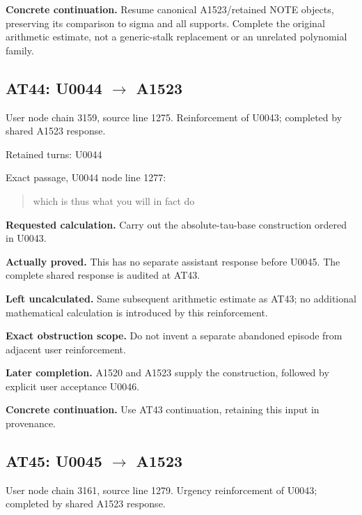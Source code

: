 \textbf{Concrete continuation.} Resume canonical A1523/retained NOTE
objects, preserving its comparison to sigma and all supports. Complete
the original arithmetic estimate, not a generic-stalk replacement or an
unrelated polynomial family.

\subsection{\texorpdfstring{AT44: U0044
\allowbreak{}\ensuremath{→}\allowbreak{}
A1523}{AT44: U0044  A1523}}\label{TranscriptLedgerStage:at44-u0044-a1523}

User node \protect{} chain
3159, source line 1275. Reinforcement of U0043; completed by shared
A1523 response.

Retained turns: U0044
\protect{}

Exact passage, U0044 node
\protect{} line 1277:

\begin{quote}
which is thus what you will in fact do
\end{quote}

\textbf{Requested calculation.} Carry out the absolute-tau-base
construction ordered in U0043.

\textbf{Actually proved.} This has no separate assistant response before
U0045. The complete shared response is audited at AT43.

\textbf{Left uncalculated.} Same subsequent arithmetic estimate as AT43;
no additional mathematical calculation is introduced by this
reinforcement.

\textbf{Exact obstruction scope.} Do not invent a separate abandoned
episode from adjacent user reinforcement.

\textbf{Later completion.} A1520 and A1523 supply the construction,
followed by explicit user acceptance U0046.

\textbf{Concrete continuation.} Use AT43 continuation, retaining this
input in provenance.

\subsection{\texorpdfstring{AT45: U0045
\allowbreak{}\ensuremath{→}\allowbreak{}
A1523}{AT45: U0045  A1523}}\label{TranscriptLedgerStage:at45-u0045-a1523}

User node \protect{} chain
3161, source line 1279. Urgency reinforcement of U0043; completed by
shared A1523 response.

